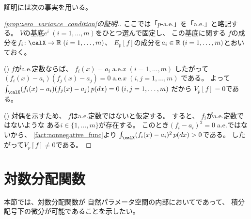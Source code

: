 \documentclass[report]{jlreq}
\begin{document}
証明には次の事実を用いる。


\begin{proof}[\cref{prop:zero_variance_condition}の証明.]
    ここでは「$p$-a.e.」を「a.e.」と略記する。
    $V$の基底$e^i \; (i = 1, \dots, m)$をひとつ選んで固定し、
    この基底に関する
    $f$の成分を$f_i \colon \calX \to \R \; (i = 1, \dots, m)$、
    $E_p[f]$の成分を$a_i \in \mathbb{R} \; (i = 1, \dots, m)$とおいておく。

    \uline{(\Leftarrow)} \quad
    $f$がa.e.定数ならば、
    $f_i(x) = a_i \;
        \text{a.e.$x$} \;
        (i = 1, \dots, m)$
    したがって
    $(f_i(x) - a_i)(f_j(x) - a_j) = 0 \;
        \text{a.e.$x$} \;
        (i, j = 1, \dots, m)$
    である。
    よって
    $\int_\calX (f_i(x) - a_i)(f_j(x) - a_j) \, p(dx) = 0 \;
        (i, j = 1, \dots, m)$
    だから
    $V_p[f] = 0$である。

    \uline{(\Rightarrow)} \quad
    対偶を示すため、
    $f$はa.e.定数ではないと仮定する。
    すると、
    $f_i$がa.e.定数ではないような
    ある$i \in \{ 1, \dots, m \}$が存在する。
    このとき$(f_i - a_i)^2 = 0 \; \text{a.e.}$ではないから、
    \cref{fact:nonnegative_func}より
    $\int_\calX (f_i(x) - a_i)^2 \, p(dx) > 0$である。
    したがって$V_p[f] \neq 0$である。
\end{proof}

%
\section{対数分配関数}

本節では、対数分配関数が
自然パラメータ空間の内部において\smooth であって、
積分記号下の微分が可能であることを示したい。
\end{document}
